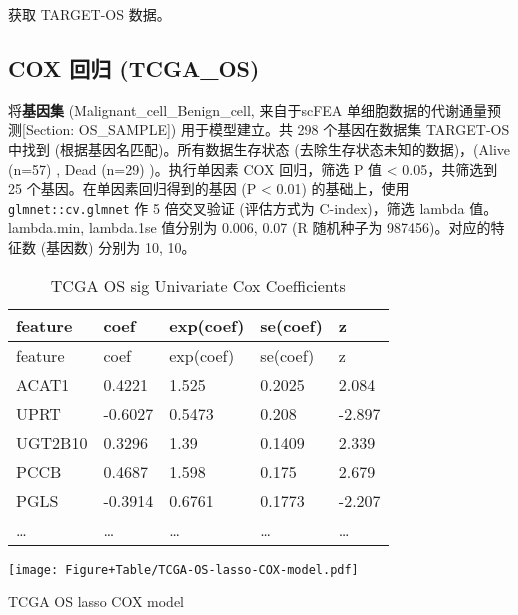 \documentclass[
]{article}
\begin{document}
获取 TARGET-OS 数据。

\hypertarget{cox-ux56deux5f52-tcga_os}{%
\subsection{COX 回归 (TCGA\_OS)}\label{cox-ux56deux5f52-tcga_os}}

将\textbf{基因集} (Malignant\_cell\_Benign\_cell, 来自于scFEA 单细胞数据的代谢通量预测{[}Section: OS\_SAMPLE{]}) 用于模型建立。共 298 个基因在数据集 TARGET-OS 中找到 (根据基因名匹配)。所有数据生存状态 (去除生存状态未知的数据)，(Alive (n=57) , Dead (n=29) )。执行单因素 COX 回归，筛选 P 值 \textless{} 0.05，共筛选到 25 个基因。在单因素回归得到的基因 (P \textless{} 0.01) 的基础上，使用 \texttt{glmnet::cv.glmnet} 作 5 倍交叉验证 (评估方式为 C-index)，筛选 lambda 值。lambda.min, lambda.1se 值分别为 0.006, 0.07 (R 随机种子为 987456)。对应的特征数 (基因数) 分别为 10, 10。

\begin{center}\vspace{1.5cm}\end{center}

\begin{longtable}[]{@{}lllll@{}}
\caption{\label{tab:TCGA-OS-sig-Univariate-Cox-Coefficients}TCGA OS sig Univariate Cox Coefficients}\tabularnewline
\toprule
feature & coef & exp(coef) & se(coef) & z\tabularnewline
\midrule
\endfirsthead
\toprule
feature & coef & exp(coef) & se(coef) & z\tabularnewline
\midrule
\endhead
ACAT1 & 0.4221 & 1.525 & 0.2025 & 2.084\tabularnewline
UPRT & -0.6027 & 0.5473 & 0.208 & -2.897\tabularnewline
UGT2B10 & 0.3296 & 1.39 & 0.1409 & 2.339\tabularnewline
PCCB & 0.4687 & 1.598 & 0.175 & 2.679\tabularnewline
PGLS & -0.3914 & 0.6761 & 0.1773 & -2.207\tabularnewline
\ldots{} & \ldots{} & \ldots{} & \ldots{} & \ldots{}\tabularnewline
\bottomrule
\end{longtable}

\begin{center}\vspace{1.5cm}\end{center}

\begin{center}\vspace{1.5cm}\end{center}
\def\@captype{figure}
\begin{center}
\texttt{[image: Figure+Table/TCGA-OS-lasso-COX-model.pdf]}
\caption{TCGA OS lasso COX model}\label{fig:TCGA-OS-lasso-COX-model}
\end{center}
\end{document}
